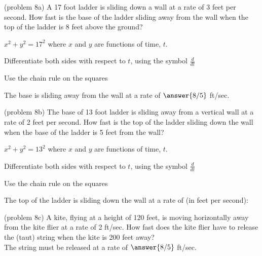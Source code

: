 \documentclass{ximera}
\begin{document}
\begin{problem}(problem 8a)
A 17 foot ladder is sliding down a wall at a rate of 3 feet per second.  How fast is the base of the 
ladder sliding away from the wall when the top of the ladder is 8 feet above the ground?\\

\begin{hint}
$x^2 + y^2 = 17^2$ where  $x$ and $y$ are functions of time, $t$.
\end{hint}

\begin{hint}
Differentiate both sides with respect to $t$, using the symbol $\frac{d}{dt}$
\end{hint}
\begin{hint}
Use the chain rule on the squares
\end{hint}

The base is sliding away from the wall at a rate of $\answer{8/5}$ ft/sec.
\end{problem}

\begin{problem}(problem 8b)
The base of 13 foot ladder is sliding away from a vertical wall at a rate of 2 
feet per second.  How fast is the top of the ladder sliding down the wall when the base of the 
ladder is 5 feet from the wall?
\begin{hint}
$x^2 + y^2 = 13^2$ where  $x$ and $y$ are functions of time, $t$.
\end{hint}

\begin{hint}
Differentiate both sides with respect to $t$, using the symbol $\frac{d}{dt}$
\end{hint}
\begin{hint}
Use the chain rule on the squares
\end{hint}

The top of the ladder is sliding down the wall at a rate of (in feet per second):
\begin{multipleChoice}
\end{multipleChoice}
\end{problem}


\begin{problem}(problem 8c)
A kite, flying at a height of 120 feet, is moving horizontally away from the kite flier at a rate of 2 ft/sec.  
How fast does the kite flier have to release the (taut) string when the kite is 200 feet away?\\

The string must be released at a rate of $\answer{8/5}$ ft/sec.


\end{problem}
\end{document}
